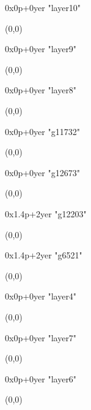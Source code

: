    0x0p+0yer "layer10"
  \begin{textblock}{1}(0,0)
  \end{textblock}

   0x0p+0yer "layer9"
  \begin{textblock}{1}(0,0)
  \end{textblock}

   0x0p+0yer "layer8"
  \begin{textblock}{1}(0,0)
  \end{textblock}

   0x0p+0yer "g11732"
  \begin{textblock}{1}(0,0)
  \end{textblock}

   0x0p+0yer "g12673"
  \begin{textblock}{1}(0,0)
  \end{textblock}

   0x1.4p+2yer "g12203"
  \begin{textblock}{1}(0,0)
  \end{textblock}

   0x1.4p+2yer "g6521"
  \begin{textblock}{1}(0,0)
  \end{textblock}

   0x0p+0yer "layer4"
  \begin{textblock}{1}(0,0)
  \end{textblock}

   0x0p+0yer "layer7"
  \begin{textblock}{1}(0,0)
  \end{textblock}

   0x0p+0yer "layer6"
  \begin{textblock}{1}(0,0)
  \end{textblock}
